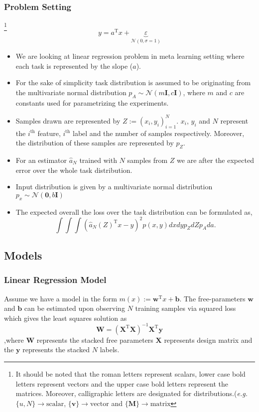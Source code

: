 \subsubsection{Problem Setting}
\footnote{It should be noted that the roman letters represent scalars, lower case bold letters represent vectors and the upper case bold letters represent the matrices. Moreover, calligraphic letters are designated for distributions.(\textit{e.g.} $\{u,N\}\to\text{scalar}$, $\{\bm{v}\}\to\text{vector}$ and $\{\bm{M}\}\to\text{matrix}$}
\begin{equation}\label{eq:reg}
  y = a^\text{T}x + \underbrace{\varepsilon}_{\mathcal{N}(0,\sigma=1)}
\end{equation}
\begin{itemize}
  \item We are looking at linear regression problem in meta learning setting where each task is represented by the slope ($a$).
  \item For the sake of simplicity  task distribution is assumed to be originating from the multivariate normal distribution $p_A\sim\mathcal{N}(m\boldsymbol{I},c\boldsymbol{I})$, where $m$ and $c$ are constants used for parametrizing the experiments.
  \item Samples drawn are represented by $Z:=(x_i,y_i)_{i=1}^{N}$. $x_i$, $y_i$ and $N$ represent the $i^{\text{th}}$ feature, $i^{\text{th}}$ label and the number of samples respectively. Moreover, the distribution of these samples are represented by $p_Z$.
  \item For an estimator $\hat{a}_N$ trained with $N$ samples from $Z$ we are after the expected error over the whole task distribution.
  \item Input distribution is given by a multivariate normal distribution $p_x \sim \mathcal{N}(\boldsymbol{0},b\boldsymbol{I})$
  \item The expected overall the loss over the task distribution can be formulated as,
  \begin{equation}\label{eq:loss}
    \int\int\int(\hat{a}_N(Z)^\text{T}x-y)^2p(x,y)dxdyp_ZdZp_Ada.
  \end{equation}
\end{itemize}

\subsection{Models}

\subsubsection{Linear Regression Model}\label{section:Linear}
Assume we have a model in the form $m(x):= \mathbf{w}^\text{T}x+\mathbf{b}$. The free-parameters $\mathbf{w}$ and $\mathbf{b}$ can be estimated upon observing $N$ training samples via squared loss which gives the least squares solution as
\begin{equation}
  \mathbf{W}=(\mathbf{X}^{\text{T}}\mathbf{X})^{-1}\mathbf{X}^{\text{T}}\mathbf{y}
\end{equation}
,where $\mathbf{W}$ represents the stacked free parameters $\mathbf{X}$ represents design matrix and the $\mathbf{y}$ represents the stacked $N$ labels.

